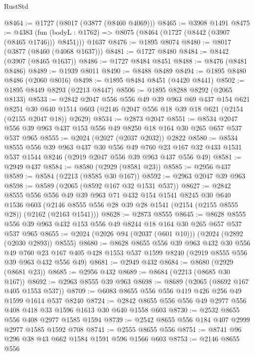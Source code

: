 \begin{lexlean}{RustStd}
\begin{coremodule}
@8464 := @1727 (@8017 (@3877 (@8460 @4069)))
@8465 := @3908 @1491
@8475 := @4383
    (fun (bodyL : @1762) => @8075 (@8464 (@1727 (@8442 (@3907 (@8465 @1746))) @8451)))
    @1637
@8476 := @1895 @8074
@8480 := @8017 (@3877 (@8460 (@4068 @1637)))
@8481 := @1727 @8480
@8484 := @8442 (@3907 (@8465 @1637))
@8486 := @1727 @8484 @8451
@8488 := @8476 (@8481 @8486)
@8489 := @1939 @8011
@8490 := @8488 @8489
@8494 := @1895 @8480 @8486 (@2060 @8016)
@8498 := @1895 @8484 @8451 (@4420 @8441)
@8502 := @1895 @8449 @8293 (@2213 @8447)
@8506 := @1895 @8288 @8292 (@2065 @8133)
@8533 := @2842
    @2047
    @556
    @556
    @49
    @39
    @963
    @69
    @437
    @154
    @621
    @8251
    @30
    @640
    @1514
    @603
    (@2146 @2047 @556 @18 @39 @18 @621 (@2154 (@2155 @2047 @18)) @2629)
@8534 := @2873 @2047
@8551 := @8534 @2047 @556 @39 @963 @437 @153 @556 @49 @8250 @18 @164 @30 @265 @657 @537 @537 @965
@8555 := @2024 (@2027 (@2037 @2032)) @2822
@8580 := @8534
    @8555
    @556
    @39
    @963
    @437
    @30
    @556
    @49
    @760
    @23
    @167
    @32
    @433
    @1531
    @537
    @1544
    @8246
    (@2919 @2047 @556 @39 @963 @437 @556 @49)
@8581 := @2949 @437
@8584 := @8580 (@2929 (@8581 @23))
@8585 := @2956 @437
@8589 := @8584 (@2213 (@8585 @30 @167))
@8592 := @2963 @2047 @39 @963
@8598 := @8589 (@2065 (@8592 @167 @32 @1531 @537))
@8627 := @2842
    @8555
    @556
    @556
    @49
    @39
    @963
    @71
    @432
    @154
    @1541
    @8245
    @30
    @640
    @1536
    @603
    (@2146 @8555 @556 @28 @39 @28 @1541 (@2154 (@2155 @8555 @28)) (@2162 (@2163 @1541)))
@8628 := @2873 @8555
@8645 := @8628 @8555 @556 @39 @963 @432 @153 @556 @49 @8244 @18 @164 @30 @265 @657 @537 @537 @965
@8655 := @2024 (@2026 @94 (@2037 (@601 @10))) (@2024 (@2892 (@2030 @2893)) @8555)
@8680 := @8628
    @8655
    @556
    @39
    @963
    @432
    @30
    @556
    @49
    @760
    @23
    @167
    @405
    @428
    @1553
    @537
    @1599
    @8240
    (@2919 @8555 @556 @39 @963 @432 @556 @49)
@8681 := @2949 @432
@8684 := @8680 (@2929 (@8681 @23))
@8685 := @2956 @432
@8689 := @8684 (@2213 (@8685 @30 @167))
@8692 := @2963 @8555 @39 @963
@8698 := @8689 (@2065 (@8692 @167 @405 @1553 @537))
@8709 := @6083 @8655 @556 @556 @419 @426 @256 @49 @1599 @1614 @537 @8240
@8724 := @2842 @8655 @556 @556 @49 @2977 @556 @408 @418 @33 @1596 @1613 @30 @640 @1558 @603
@8730 := @2532 @8655 @556 @408 @2977 @1585 @1594
@8739 := @2542 @8655 @556 @184 @407 @2999 @2977 @1585 @1592 @708
@8741 := @2555 @8655 @556
@8751 := @8741 @96 @296 @38 @43 @662 @1584 @1591 @596 @1566 @603
@8753 := @2146 @8655 @556

\end{coremodule}
\end{lexlean}
